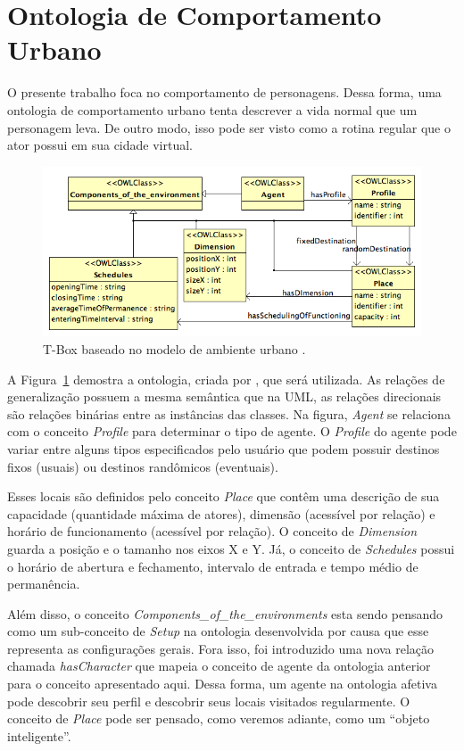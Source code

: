 \section{Ontologia de Comportamento Urbano} \label{ch:aec:ocu}

O presente trabalho foca no comportamento de personagens. Dessa forma, uma
ontologia de comportamento urbano tenta descrever a vida normal que um
personagem leva. De outro modo, isso pode ser visto como a rotina regular que
o ator possui em sua cidade virtual.

\begin{figure}
  \centering
    \includegraphics[width=150mm]{figuras/uem-tbox.png}
  \caption[T-Box baseado no modelo de ambiente urbano.]{T-Box baseado no modelo de ambiente urbano \cite{paiva2005ontology}.}
  \label{fig:UEM:TBOX}
\end{figure}

A Figura~\ref{fig:UEM:TBOX} demostra a ontologia, criada por
\citet{paiva2005ontology}, que será utilizada. As relações de generalização
possuem a mesma semântica que na UML, as relações direcionais são relações
binárias entre as instâncias das classes. Na figura, \emph{Agent} se relaciona
com o conceito \emph{Profile} para determinar o tipo de agente. O
\emph{Profile} do agente pode variar entre alguns tipos especificados pelo
usuário que podem possuir destinos fixos (usuais) ou destinos randômicos
(eventuais).

Esses locais são definidos pelo conceito \emph{Place} que contêm
uma descrição de sua capacidade (quantidade máxima de atores), dimensão
(acessível por relação) e horário de funcionamento (acessível por relação). O
conceito de \emph{Dimension} guarda a posição e o tamanho nos eixos X e Y. Já,
o conceito de \emph{Schedules} possui o horário de abertura e fechamento,
intervalo de entrada e tempo médio de permanência.

Além disso, o conceito \emph{Components\_of\_the\_environments} esta sendo
pensando como um sub-conceito de \emph{Setup} na ontologia
desenvolvida por causa que esse representa as configurações gerais.
%
Fora isso, foi introduzido uma nova relação chamada \emph{hasCharacter} que
mapeia o conceito de agente da ontologia anterior para o conceito apresentado aqui.
Dessa forma, um agente na ontologia afetiva pode descobrir seu perfil e descobrir seus locais visitados
regularmente. O conceito de \emph{Place} pode ser pensado, como veremos
adiante, como um ``objeto inteligente''.

